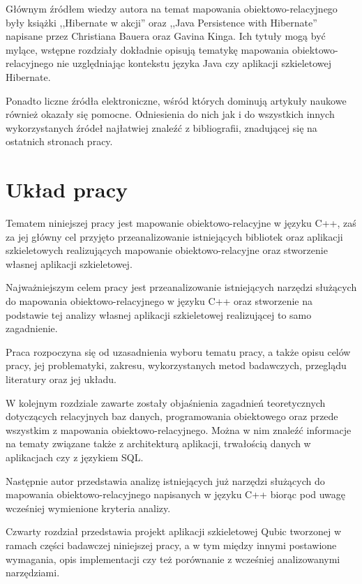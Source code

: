 \documentclass[12pt]{report}
\begin{document}
Głównym źródłem wiedzy autora na temat mapowania obiektowo-relacyjnego były książki ,,Hibernate w akcji'' \cite{hibernate} oraz ,,Java Persistence with Hibernate'' 
\cite{persistence} napisane przez Christiana Bauera oraz Gavina Kinga. Ich tytuły mogą być mylące, wstępne rozdziały dokładnie opisują tematykę mapowania
obiektowo-relacyjnego nie uzglę\-dniając kontekstu języka Java czy aplikacji szkieletowej Hibernate.

Ponadto liczne źródła elektroniczne, wśród których dominują artykuły naukowe również okazały się pomocne. Odniesienia do nich jak i do wszystkich innych wykorzystanych
źródeł najłatwiej znaleźć z bibliografii, znadującej się na ostatnich stronach pracy.

\section{Układ pracy}

Tematem niniejszej pracy jest mapowanie obiektowo-relacyjne w języku C++, zaś za jej główny cel przyjęto przeanalizowanie istniejących bibliotek oraz aplikacji szkieletowych
realizujących mapowanie obiektowo-relacyjne oraz stworzenie własnej aplikacji szkieletowej.

Najważniejszym celem pracy jest przeanalizowanie istniejących narzędzi służą\-cych do mapowania obiektowo-relacyjnego w języku C++ oraz stworzenie na podstawie tej analizy
własnej aplikacji szkieletowej realizującej to samo zagadnienie.

Praca rozpoczyna się od uzasadnienia wyboru tematu pracy, a także opisu celów pracy, jej problematyki, zakresu, wykorzystanych metod badawczych, przeglądu literatury
oraz jej układu.

W kolejnym rozdziale zawarte zostały objaśnienia zagadnień teoretycznych do\-tyczących relacyjnych baz danych, programowania obiektowego oraz przede wszystkim
z mapowania obiektowo-relacyjnego. Można w nim znaleźć informacje na tematy związane także z architekturą aplikacji, trwałością danych w aplikacjach czy z językiem SQL.

Następnie autor przedstawia analizę istniejących już narzędzi służących do ma\-powania obiektowo-relacyjnego napisanych w języku C++ biorąc pod uwagę wcze\-śniej
wymienione kryteria analizy.

Czwarty rozdział przedstawia projekt aplikacji szkieletowej Qubic tworzonej w ramach części badawczej niniejszej pracy, a w tym między innymi postawione wymagania, 
opis implementacji czy też porównanie z wcześniej analizowanymi narzędziami.
\end{document}
